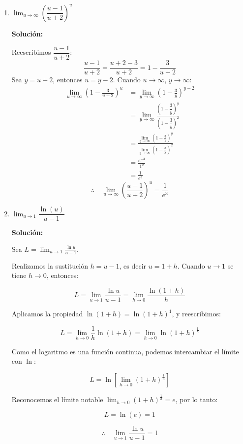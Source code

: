 \documentclass[12pt]{article}
\newcommand{\solucion}{%
    \vspace{0.8em}%
    \textbf{Solución:}%
}
\begin{document}
\begin{enumerate}[label=\alph*)]
    \item $\lim_{u \to \infty} \left(\dfrac{u - 1}{u + 2}\right)^u$

    \solucion

    Reescribimos $\dfrac{u-1}{u+2}$:
    \[
        \frac{u-1}{u+2} = \frac{u+2-3}{u+2} = 1 - \frac{3}{u+2}
    \]
    Sea $y = u+2$, entonces $u = y-2$. Cuando $u\to\infty$, $y\to\infty$:
    \begin{align*}
        \lim_{u\to\infty}\left(1-\frac{3}{u+2}\right)^u
        &= \lim_{y\to\infty}\left(1-\frac{3}{y}\right)^{y-2} \\[6pt]
        &= \lim_{y\to\infty}\frac{\left(1-\dfrac{3}{y}\right)^y}{\left(1-\dfrac{3}{y}\right)^2} \\[6pt]
        &= \frac{\displaystyle\lim_{y\to\infty}\left(1-\frac{3}{y}\right)^y}
            {\displaystyle\lim_{y\to\infty}\left(1-\frac{3}{y}\right)^2} \\[6pt]
        &= \frac{e^{-3}}{1^2} \\[6pt]
        &= \frac{1}{e^3}
    \end{align*}
    \[
        \therefore\quad \lim_{u\to\infty}\left(\frac{u-1}{u+2}\right)^u = \frac{1}{e^3}
    \]

    \newpage
    \item $\lim_{u \to 1} \dfrac{\ln(u)}{u - 1}$

    \solucion

    Sea $L = \displaystyle\lim_{u\to1}\frac{\ln u}{u-1}$.
    
    Realizamos la sustitución $h = u - 1$, es decir $u = 1 + h$. Cuando $u \to 1$ se tiene $h \to 0$, entonces:

    \[
        L = \lim_{u\to1}\frac{\ln u}{u-1} = \lim_{h\to0}\frac{\ln(1+h)}{h}
    \]

    Aplicamos la propiedad $\ln(1+h) = \ln(1+h)^1$, y reescribimos:

    \[
        L = \lim_{h\to0} \frac{1}{h}\ln(1+h) = \lim_{h\to0}\ln(1+h)^{\frac{1}{h}}
    \]

    Como el logaritmo es una función continua, podemos intercambiar el límite con $\ln$:

    \[
        L = \ln\left[\lim_{h\to0}(1+h)^{\frac{1}{h}}\right]
    \]

    Reconocemos el límite notable $\displaystyle\lim_{h\to0}(1+h)^{\frac{1}{h}} = e$, por lo tanto:

    \[
        L = \ln(e) = 1
    \]

    \[
        \therefore\quad \lim_{u\to1}\frac{\ln u}{u-1} = 1
    \]
\end{enumerate}
\end{document}
